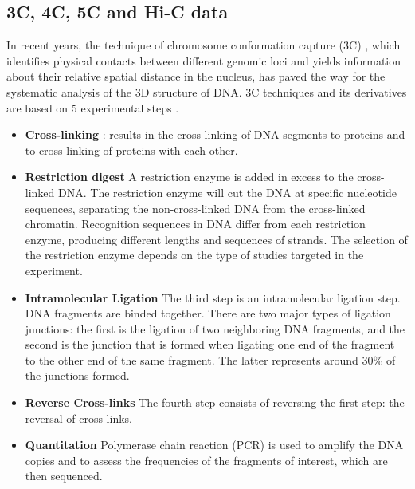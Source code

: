 \subsection{3C, 4C, 5C and Hi-C data}

In recent years, the technique of chromosome conformation capture (3C)
\citep{dekker:capturing}, which identifies physical contacts between different
genomic loci and yields information about their relative spatial distance in
the nucleus, has paved the way for the systematic analysis of the 3D structure
of DNA. 3C techniques and its derivatives are based on 5 experimental steps
\citep{lieberman-aiden:comprehensive, kalhor:genome}.

\begin{itemize}
\item \textbf{Cross-linking} : results in the cross-linking of DNA segments to
proteins and to cross-linking of proteins with each other.
\item \textbf{Restriction digest} A restriction enzyme is added in excess to
the cross-linked DNA. The restriction enzyme will cut the DNA at specific
nucleotide sequences, separating the non-cross-linked DNA from the
cross-linked chromatin. Recognition sequences in DNA differ from each
restriction enzyme, producing different lengths and sequences of strands.
The selection of the restriction enzyme depends on the type of studies
targeted in the experiment.
\item \textbf{Intramolecular Ligation} The third step is an intramolecular
ligation step. DNA fragments are binded together. There are two major types
of ligation junctions: the first is the ligation of two neighboring DNA
fragments, and the second is the junction that is formed when ligating one end
of the fragment to the other end of the same fragment. The latter represents
around 30\% of the junctions formed.
\item \textbf{Reverse Cross-links} The fourth step consists of reversing the
first step: the reversal of cross-links.
\item \textbf{Quantitation} Polymerase chain reaction (PCR) is used to amplify
the DNA copies and to assess the frequencies of the fragments of interest,
which are then sequenced.
\end{itemize}


